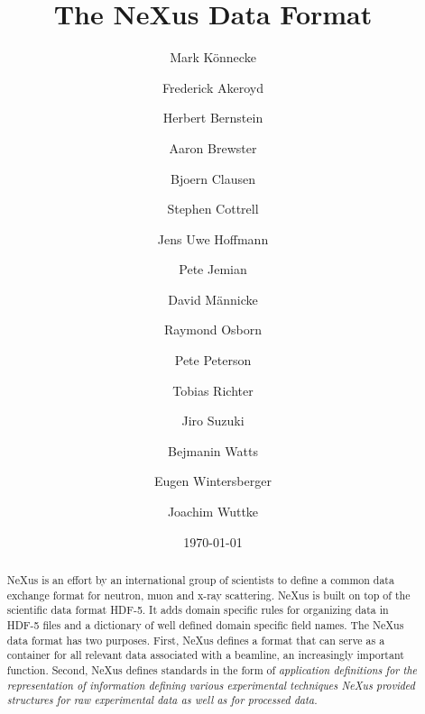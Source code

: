 \documentclass[%
 aip,
rsi,
 amsmath,amssymb,
 reprint,%
]{revtex4-1}
\begin{document}

\title{The NeXus Data Format}


\author{Mark K\"onnecke}
\author{Frederick Akeroyd}

\author{Herbert Bernstein}

\author{Aaron Brewster}

\author{Bjoern Clausen}

\author{Stephen Cottrell}

\author{Jens Uwe Hoffmann}

\author{Pete Jemian}

\author{David M\"annicke}

\author{Raymond Osborn}

\author{Pete Peterson}

\author{Tobias Richter}

\author{Jiro Suzuki}


\author{Bejmanin Watts}

\author{Eugen Wintersberger}

\author{Joachim Wuttke}



\date{\today}%

\begin{abstract}
NeXus is an effort by an international group of scientists to define 
 a common data exchange format for neutron, muon and x-ray scattering.   
NeXus is built on top of the scientific data format HDF-5. It adds domain 
specific rules for organizing data in HDF-5 files and a dictionary of well 
defined domain specific field names. The NeXus data format has two purposes.  First, NeXus defines a
format that can serve as a container for all relevant data associated
with a beamline, an increasingly important function.  Second, NeXus
defines standards in the form of \em{application definitions} for the
representation of information defining various experimental
techniques NeXus provided structures for raw experimental data as well as for processed data.  
\end{abstract}
\end{document}
